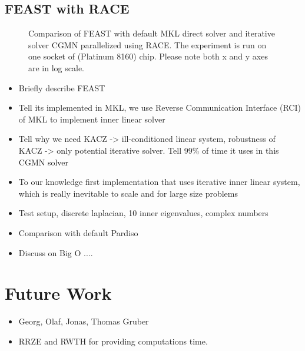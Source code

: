 \subsection{FEAST with RACE}
\begin{figure}[tb]
	\centering
	\scalebox{0.56}{}
	\caption{Comparison of FEAST with default \acrshort{MKL} direct solver and 
		iterative solver CGMN parallelized using \acrshort{RACE}. The experiment is
		run on one socket of \SKX (Platinum 8160) chip. Please note both x and y axes
		are in log scale.}
\end{figure}
\lipsum
\begin{itemize}
	\item Briefly describe FEAST
	\item Tell its implemented in MKL, we use Reverse Communication Interface (RCI) of
		\acrshort{MKL} to implement inner linear solver
	\item Tell why we need KACZ -> ill-conditioned linear system, robustness of KACZ -> only potential iterative solver. Tell 99\% of time it uses in this CGMN solver
	\item To our knowledge first implementation that uses iterative inner linear system, which is really inevitable to scale and for large size problems
	\item  Test setup, discrete laplacian, 10 inner eigenvalues, complex numbers 
	\item Comparison with default Pardiso
	\item Discuss on Big O ....
\end{itemize}


\section{Future Work}

\begin{acks}
\begin{itemize}
	\item Georg, Olaf, Jonas, Thomas Gruber
	\item RRZE and RWTH for providing computations time.
\end{itemize}
\end{acks}


